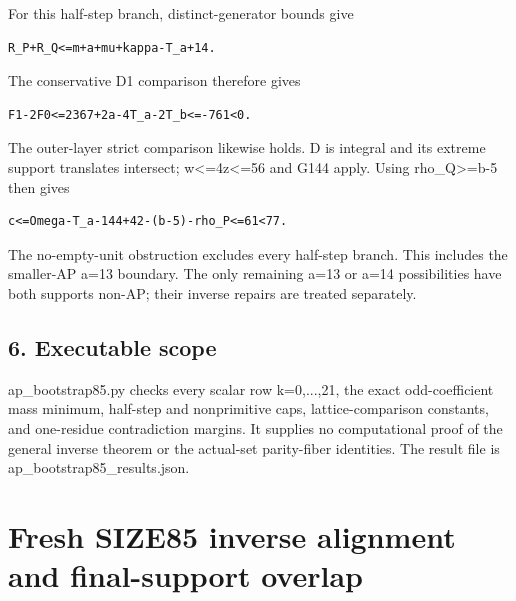 \documentclass[10pt,a4paper]{article}
\theoremstyle{definition}
\begin{document}
For this half-step branch,\allowbreak{} distinct-generator bounds give

\begin{lstlisting}
R_P+R_Q<=m+a+mu+kappa-T_a+14.
\end{lstlisting}

The conservative D1 comparison therefore gives

\begin{lstlisting}
F1-2F0<=2367+2a-4T_a-2T_b<=-761<0.
\end{lstlisting}

The outer-layer strict comparison likewise holds. D is integral and its
extreme support translates intersect; w\textless=\allowbreak{}4z\textless=\allowbreak{}56 and G144
apply. Using rho\_\allowbreak{}Q\textgreater=\allowbreak{}b-5 then gives

\begin{lstlisting}
c<=Omega-T_a-144+42-(b-5)-rho_P<=61<77.
\end{lstlisting}

The no-empty-unit obstruction excludes every half-step branch. This
includes the smaller-AP a=\allowbreak{}13 boundary. The only remaining a=\allowbreak{}13 or a=\allowbreak{}14
possibilities have both supports non-AP; their inverse repairs are
treated separately.

\hypertarget{executable-scope}{%
\subsection{6. Executable scope}\label{executable-scope}}

ap\_\allowbreak{}bootstrap85.py checks every scalar row k=\allowbreak{}0,\allowbreak{}...,\allowbreak{}21,\allowbreak{} the exact
odd-coefficient mass minimum,\allowbreak{} half-step and nonprimitive caps,\allowbreak{}
lattice-comparison constants,\allowbreak{} and one-residue contradiction margins. It
supplies no computational proof of the general inverse theorem or the
actual-set parity-fiber identities. The result file is
ap\_\allowbreak{}bootstrap85\_\allowbreak{}results.json.

\clearpage
\hypertarget{fresh-size85-inverse-alignment-and-final-support-overlap}{%
\section{Fresh SIZE85 inverse alignment and final-support
overlap}\label{fresh-size85-inverse-alignment-and-final-support-overlap}}
\end{document}
